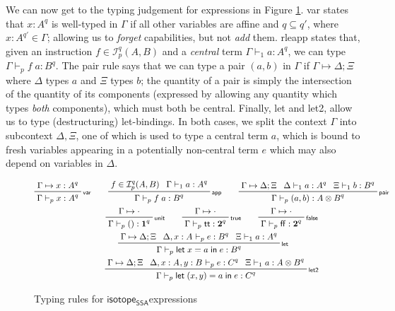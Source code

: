 \documentclass[acmsmall,screen,review]{acmart}
\newcommand{\mc}[1]{\ensuremath{\mathcal{#1}}}
\newcommand{\mb}[1]{\ensuremath{\mathbf{#1}}}
\newcommand{\ms}[1]{\ensuremath{\mathsf{#1}}}
\newcommand{\lbl}[1]{{`#1}}
\newcommand{\ctt}{\ms{tt}}
\newcommand{\cff}{\ms{ff}}
\newcommand{\letexpr}[3]{\ensuremath{\ms{let}\;#1 = #2\;\ms{in}\;#3}}
\newcommand{\csplits}[3]{#1 \mapsto #2;#3}
\newcommand{\cwk}[2]{#1 \mapsto #2}
\newcommand{\thyp}[3]{#1: {#2}^{#3}}
\newcommand{\lhyp}[3]{#1[#2](#3)}
\newcommand{\llhyp}[3]{\lhyp{\lbl{#1}}{#2}{#3}}
\newcommand{\rle}[1]{{\scriptsize\textsf{#1}}}
\newcommand{\hasty}[5]{#1 \vdash_{#2} #3: {#4}^{#5}}
\newcommand{\haslb}[3]{#1 \vdash #2 \rhd #3}
\newcommand{\isotopessa}{\ms{isotope_{SSA}}}
\begin{document}
We can now get to the typing judgement for expressions in Figure
\ref{fig:ssa-term-typing}. \rle{var} states that \(\thyp{x}{A}{q}\) is
well-typed in \(\Gamma\) if all other variables are affine and \(q \subseteq
q'\), where \(\thyp{x}{A}{q'} \in \Gamma\); allowing us to \textit{forget}
capabilities, but not \textit{add} them. rle{app} states that, given an
instruction \(f \in \mc{I}_p^q(A, B)\) and a \textit{central} term
\(\hasty{\Gamma}{1}{a}{A}{q}\), we can type \(\hasty{\Gamma}{p}{f\;a}{B}{q}\).
The \rle{pair} rule says that we can type a pair \((a, b)\) in \(\Gamma\) if
\(\csplits{\Gamma}{\Delta}{\Xi}\) where \(\Delta\) types \(a\) and \(\Xi\) types
\(b\); the quantity of a pair is simply the intersection of the quantity of its
components (expressed by allowing any quantity which types \textit{both}
components), which must both be central. Finally, \rle{let} and \rle{let2},
allow us to type (destructuring) let-bindings. In both cases, we split the
context \(\Gamma\) into subcontext \(\Delta, \Xi\), one of which is used to type
a central term \(a\), which is bound to fresh variables appearing in a
potentially non-central term \(e\) which may also depend on variables in
\(\Delta\).

\begin{figure}
  \begin{gather*}    
    \prftree[r]{\rle{var}}
      {\cwk{\Gamma}{\thyp{x}{A}{q}}}
      {\hasty{\Gamma}{p}{x}{A}{q}} \qquad
    \prftree[r]{\rle{app}}
      {f \in \mc{I}_p^q(A, B)}
      {\hasty{\Gamma}{1}{a}{A}{q}}
      {\hasty{\Gamma}{p}{f\;a}{B}{q}} \qquad
    \prftree[r]{\rle{pair}}
      {\csplits{\Gamma}{\Delta}{\Xi}}
      {\hasty{\Delta}{1}{a}{A}{q}}
      {\hasty{\Xi}{1}{b}{B}{q}}
      {\hasty{\Gamma}{p}{(a, b)}{A \otimes B}{q}} \\
    \prftree[r]{\rle{unit}}
      {\cwk{\Gamma}{\cdot}}
      {\hasty{\Gamma}{p}{()}{\mb{1}}{q}} \qquad
    \prftree[r]{\rle{true}}
      {\cwk{\Gamma}{\cdot}}
      {\hasty{\Gamma}{p}{\ctt}{\mb{2}}{q}} \qquad
    \prftree[r]{\rle{false}}
      {\cwk{\Gamma}{\cdot}}
      {\hasty{\Gamma}{p}{\cff}{\mb{2}}{q}} \\
    \prftree[r]{\rle{let}}
      {\csplits{\Gamma}{\Delta}{\Xi}}
      {\hasty{\Delta, \thyp{x}{A}{}}{p}{e}{B}{q}}
      {\hasty{\Xi}{1}{a}{A}{q}}
      {\hasty{\Gamma}{p}{\letexpr{x}{a}{e}}{B}{q}} \qquad
      \\
    \prftree[r]{\rle{let2}}
      {\csplits{\Gamma}{\Delta}{\Xi}}
      {\hasty{\Delta, \thyp{x}{A}{}, \thyp{y}{B}{}}{p}{e}{C}{q}}
      {\hasty{\Xi}{1}{a}{A \otimes B}{q}}
      {\hasty{\Gamma}{p}{\letexpr{(x, y)}{a}{e}}{C}{q}}
  \end{gather*}
  \caption{Typing rules for \isotopessa expressions}
  \label{fig:ssa-term-typing}
\end{figure}
\end{document}
